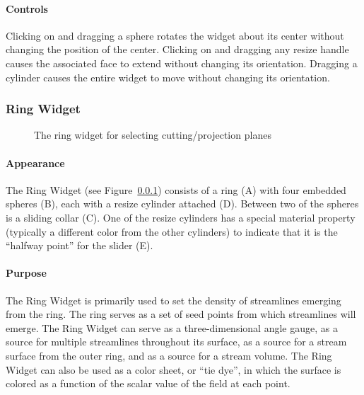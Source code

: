 \paragraph{Controls} Clicking on and dragging a sphere rotates
the widget about its center without changing the position of the center.
Clicking on and dragging any resize handle
causes the associated face to extend without changing its orientation.
Dragging a cylinder causes the entire widget to move without changing its
orientation.

\subsubsection{Ring Widget}
\label{sec:view-ringwidget} 

\begin{figure}[htb]
  \begin{makeimage}
  \end{makeimage}
  \ringwidget
  \caption{\label{fig:ringwidget} The ring widget for selecting
    cutting/projection planes}
\end{figure}


\paragraph{Appearance} The Ring
Widget (see Figure~\ref{sec:view-ringwidget}) consists of a ring (A)
with four embedded spheres (B), each with a resize cylinder
attached (D).  Between two of the spheres is a sliding collar (C).
One of the resize cylinders has a special material property (typically
a different color from the other cylinders) to indicate that it is the
``halfway point'' for the slider (E).

\paragraph{Purpose} The Ring Widget is primarily used to set the
density of streamlines emerging from the ring. The ring serves as a set of
seed points from which streamlines will emerge. The Ring Widget can 
serve as a three-dimensional angle gauge, as a source for multiple
streamlines throughout its surface, as a source for a stream surface from
the outer ring, and as a source for a stream volume.  The Ring Widget can 
also be used as a color sheet, or ``tie dye'', in which the surface is colored as 
a function of the scalar value of the field at each point.

